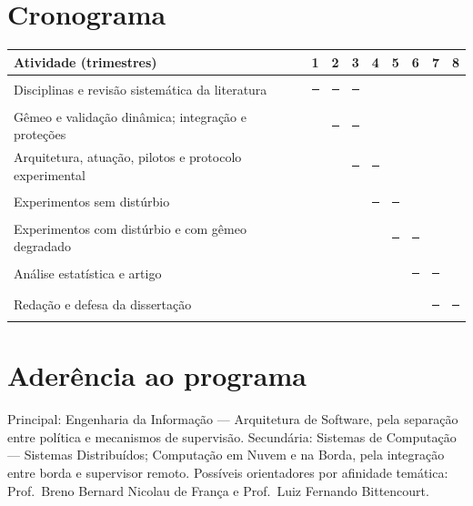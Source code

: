 \documentclass[11pt,a4paper]{article}
\newcommand{\cmark}{\rule{0.9em}{0.9em}}
\begin{document}
\section{Cronograma}

{\centering
\footnotesize\renewcommand{\arraystretch}{0.9}
\begin{tabular}{@{}lcccccccc@{}}
\toprule
Atividade (trimestres) & 1 & 2 & 3 & 4 & 5 & 6 & 7 & 8 \\
\midrule
Disciplinas e revisão sistemática da literatura                       & \cmark & \cmark & \cmark &        &        &        &        &        \\
Gêmeo e validação dinâmica; integração e proteções                  &        & \cmark & \cmark &        &        &        &        &        \\
Arquitetura, atuação, pilotos e protocolo experimental              &        &        & \cmark & \cmark &        &        &        &        \\
Experimentos sem distúrbio                                            &        &        &        & \cmark & \cmark &        &        &        \\
Experimentos com distúrbio e com gêmeo degradado                      &        &        &        &        & \cmark & \cmark &        &        \\
Análise estatística e artigo                                          &        &        &        &        &        & \cmark & \cmark &        \\
Redação e defesa da dissertação                                       &        &        &        &        &        &        & \cmark & \cmark \\
\bottomrule
\end{tabular}\par}

\section{Aderência ao programa}

Principal: Engenharia da Informação --- Arquitetura de Software, pela separação entre política e mecanismos de supervisão. Secundária: Sistemas de Computação --- Sistemas Distribuídos; Computação em Nuvem e na Borda, pela integração entre borda e supervisor remoto. Possíveis orientadores por afinidade temática: Prof.~Breno Bernard Nicolau de França e Prof.~Luiz Fernando Bittencourt.

\clearpage


\end{document}
